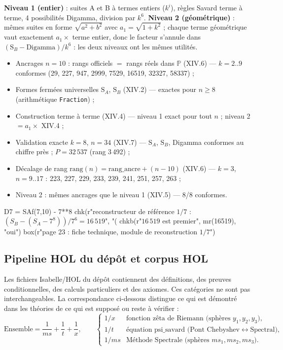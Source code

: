 \documentclass[11pt,a4paper]{article}
\newcommand{\SA}{\mathrm{S}_A}
\newcommand{\SB}{\mathrm{S}_B}
\begin{document}
\textbf{Niveau 1 (entier)} : suites A et B à termes entiers ($k^{i}$), règles
Savard terme à terme, 4 possibilités Digamma, division par $k^{6}$.
\textbf{Niveau 2 (géométrique)} : mêmes suites en forme $\sqrt{a^{2}+b^{2}}$
avec $a_1 = \sqrt{1+k^{2}}$ ; chaque terme géométrique vaut exactement
$a_1 \times$ terme entier, donc le facteur s'annule dans
$(\SB - \text{Digamma})/k^{6}$ : les deux niveaux ont les mêmes utilités.

\vspace{0.3cm}
\begin{boiteformule}
\begin{itemize}[nosep]
  \item Ancrages $n=10$ : rangs officiels $=$ rangs réels dans $\mathbb{P}$ (XIV.6) --- $k=2..9$ conformes (29, 227, 947, 2999, 7529, 16519, 32327, 58337) ;
  \item Formes fermées universelles $\SA$, $\SB$ (XIV.2) --- exactes pour $n \ge 8$ (arithmétique \texttt{Fraction}) ;
  \item Construction terme à terme (XIV.4) --- niveau 1 exact pour tout $n$ ; niveau 2 $= a_1 \times$ XIV.4 ;
  \item Validation exacte $k=8$, $n=34$ (XIV.7) --- $\SA$, $\SB$, Digamma conformes au chiffre près ; $P = 32\,537$ (rang 3\,492) ;
  \item Décalage de rang $\text{rang}(n) = \text{rang\_ancre} + (n-10)$ (XIV.6) --- $k=3$, $n=9..17$ : 223, 227, 229, 233, 239, 241, 251, 257, 263 ;
  \item Niveau 2 : mêmes ancrages que le niveau 1 (XIV.5) --- 8/8 conformes.
\end{itemize}
\end{boiteformule}

\begin{pycode}
D7 = SAf(7,10) - 7**8
chk(r"reconstructeur de référence $1/7$ : $(S_B-(S_A-7^8))/7^6=16\,519$", "(%
chkb(r"$16\,519$ est premier", mr(16519), "oui")
box(r"page 23 : fiche technique, module de reconstruction $1/7$")
\end{pycode}

\subsection{Pipeline HOL du dépôt et corpus HOL}

Les fichiers Isabelle/HOL du dépôt contiennent des définitions, des preuves
conditionnelles, des calculs particuliers et des axiomes. Ces catégories ne
sont pas interchangeables. La correspondance ci-dessous distingue ce qui est
démontré dans les théories de ce qui est supposé ou reste à vérifier :
\[
\text{Ensemble} = \frac{1}{ms} + \frac{1}{t} + \frac{1}{x},
\qquad
\begin{cases}
1/x & \text{fonction zêta de Riemann (sphères } y_1, y_2, y_3\text{)},\\
1/t & \text{équation psi\_savard (Pont Chebyshev} \leftrightarrow \text{Spectral)},\\
1/ms & \text{Méthode Spectrale (sphères } ms_1, ms_2, ms_3\text{)}.
\end{cases}
\]
\end{document}
